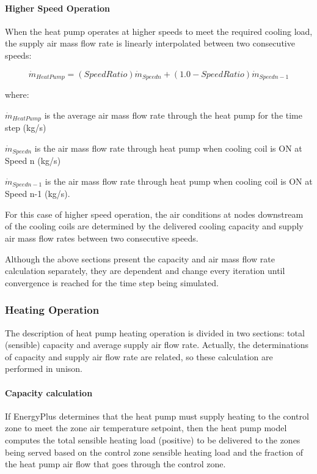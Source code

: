 \paragraph{Higher Speed Operation}\label{higher-speed-operation-1}

When the heat pump operates at higher speeds to meet the required cooling load, the supply air mass flow rate is linearly interpolated between two consecutive speeds:

\begin{equation}
{\dot m_{HeatPump}} = (SpeedRatio){\dot m_{Speedn}} + (1.0 - SpeedRatio){\dot m_{Speedn-1}}
\end{equation}

where:

\({\dot m_{HeatPump}}\) is the average air mass flow rate through the heat pump for the time step (kg/s)

\({\dot m_{Speedn}}\) is the air mass flow rate through heat pump when cooling coil is ON at Speed n (kg/s)

\({\dot m_{Speedn-1}}\) is the air mass flow rate through heat pump when cooling coil is ON at Speed n-1 (kg/s).

For this case of higher speed operation, the air conditions at nodes downstream of the cooling coils are determined by the delivered cooling capacity and supply air mass flow rates between two consecutive speeds.

Although the above sections present the capacity and air mass flow rate calculation separately, they are dependent and change every iteration until convergence is reached for the time step being simulated.

\subsubsection{Heating Operation}\label{heating-operation-1}

The description of heat pump heating operation is divided in two sections: total (sensible) capacity and average supply air flow rate. Actually, the determinations of capacity and supply air flow rate are related, so these calculation are performed in unison.

\paragraph{Capacity calculation}\label{capacity-calculation-1}

If EnergyPlus determines that the heat pump must supply heating to the control zone to meet the zone air temperature setpoint, then the heat pump model computes the total sensible heating load (positive) to be delivered to the zones being served based on the control zone sensible heating load and the fraction of the heat pump air flow that goes through the control zone.

